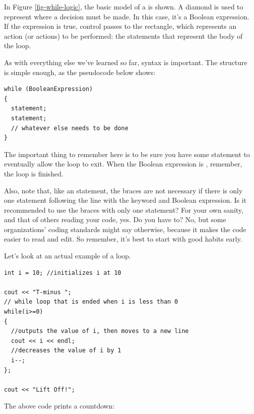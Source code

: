 In Figure \ref{fig-while-logic}, the basic model of a  is shown.
A diamond is used to represent where a decision must be made.
In this case, it's a Boolean expression.
If the expression is true, control passes to the rectangle, which represents an action (or actions) to be performed: the statements that represent the body of the loop.

As with everything else we've learned so far, syntax is important. The structure is simple enough, as the pseudocode below shows:

\noindent\begin{minipage}{\linewidth}\begin{lstlisting}
while (BooleanExpression)
{
  statement;
  statement;
  // whatever else needs to be done
}
\end{lstlisting}\end{minipage}

The important thing to remember here is to be sure you have some statement to eventually allow the loop to exit.
When the Boolean expression is , remember, the loop is finished.

Also, note that, like an  statement, the braces are not necessary if there is only one statement following the line with the  keyword and Boolean expression.
Is it recommended to use the braces with only one statement?
For your own sanity, and that of others reading your code, yes.
Do you have to?
No, but some organizations' coding standards might say otherwise, because it makes the code easier to read and edit.
So remember, it's best to start with good habits early.

\noindent Let's look at an actual example of a  loop. \nopagebreak[4]

\noindent\begin{minipage}{\linewidth}\begin{lstlisting}
int i = 10;	//initializes i at 10

cout << "T-minus ";
// while loop that is ended when i is less than 0
while(i>=0)	
{ 
  //outputs the value of i, then moves to a new line
  cout << i << endl;	
  //decreases the value of i by 1
  i--;	
};

cout << "Lift Off!";
\end{lstlisting}\end{minipage}

\noindent The above code prints a countdown:

\noindent{}

